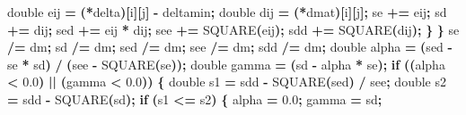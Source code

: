 \documentclass[
  12pt,
]{article}
\newenvironment{Shaded}{\begin{snugshade}}{\end{snugshade}}
\newcommand{\ControlFlowTok}[1]{\textcolor[rgb]{0.13,0.29,0.53}{\textbf{#1}}}
\newcommand{\DataTypeTok}[1]{\textcolor[rgb]{0.13,0.29,0.53}{#1}}
\newcommand{\FloatTok}[1]{\textcolor[rgb]{0.00,0.00,0.81}{#1}}
\newcommand{\NormalTok}[1]{#1}
\newcommand{\OperatorTok}[1]{\textcolor[rgb]{0.81,0.36,0.00}{\textbf{#1}}}
\begin{document}
\begin{Shaded}
\begin{Highlighting}[]
            \DataTypeTok{double}\NormalTok{ eij }\OperatorTok{=} \OperatorTok{(*}\NormalTok{delta}\OperatorTok{)[}\NormalTok{i}\OperatorTok{][}\NormalTok{j}\OperatorTok{]} \OperatorTok{{-}}\NormalTok{ deltamin}\OperatorTok{;}
            \DataTypeTok{double}\NormalTok{ dij }\OperatorTok{=} \OperatorTok{(*}\NormalTok{dmat}\OperatorTok{)[}\NormalTok{i}\OperatorTok{][}\NormalTok{j}\OperatorTok{];}
\NormalTok{            se }\OperatorTok{+=}\NormalTok{ eij}\OperatorTok{;}
\NormalTok{            sd }\OperatorTok{+=}\NormalTok{ dij}\OperatorTok{;}
\NormalTok{            sed }\OperatorTok{+=}\NormalTok{ eij }\OperatorTok{*}\NormalTok{ dij}\OperatorTok{;}
\NormalTok{            see }\OperatorTok{+=}\NormalTok{ SQUARE}\OperatorTok{(}\NormalTok{eij}\OperatorTok{);}
\NormalTok{            sdd }\OperatorTok{+=}\NormalTok{ SQUARE}\OperatorTok{(}\NormalTok{dij}\OperatorTok{);}
        \OperatorTok{\}}
    \OperatorTok{\}}
\NormalTok{    se }\OperatorTok{/=}\NormalTok{ dm}\OperatorTok{;}
\NormalTok{    sd }\OperatorTok{/=}\NormalTok{ dm}\OperatorTok{;}
\NormalTok{    sed }\OperatorTok{/=}\NormalTok{ dm}\OperatorTok{;}
\NormalTok{    see }\OperatorTok{/=}\NormalTok{ dm}\OperatorTok{;}
\NormalTok{    sdd }\OperatorTok{/=}\NormalTok{ dm}\OperatorTok{;}
    \DataTypeTok{double}\NormalTok{ alpha }\OperatorTok{=} \OperatorTok{(}\NormalTok{sed }\OperatorTok{{-}}\NormalTok{ se }\OperatorTok{*}\NormalTok{ sd}\OperatorTok{)} \OperatorTok{/} \OperatorTok{(}\NormalTok{see }\OperatorTok{{-}}\NormalTok{ SQUARE}\OperatorTok{(}\NormalTok{se}\OperatorTok{));}
    \DataTypeTok{double}\NormalTok{ gamma }\OperatorTok{=} \OperatorTok{(}\NormalTok{sd }\OperatorTok{{-}}\NormalTok{ alpha }\OperatorTok{*}\NormalTok{ se}\OperatorTok{);}
    \ControlFlowTok{if} \OperatorTok{((}\NormalTok{alpha }\OperatorTok{\textless{}} \FloatTok{0.0}\OperatorTok{)} \OperatorTok{||} \OperatorTok{(}\NormalTok{gamma }\OperatorTok{\textless{}} \FloatTok{0.0}\OperatorTok{))} \OperatorTok{\{}
        \DataTypeTok{double}\NormalTok{ s1 }\OperatorTok{=}\NormalTok{ sdd }\OperatorTok{{-}}\NormalTok{ SQUARE}\OperatorTok{(}\NormalTok{sed}\OperatorTok{)} \OperatorTok{/}\NormalTok{ see}\OperatorTok{;}
        \DataTypeTok{double}\NormalTok{ s2 }\OperatorTok{=}\NormalTok{ sdd }\OperatorTok{{-}}\NormalTok{ SQUARE}\OperatorTok{(}\NormalTok{sd}\OperatorTok{);}
        \ControlFlowTok{if} \OperatorTok{(}\NormalTok{s1 }\OperatorTok{\textless{}=}\NormalTok{ s2}\OperatorTok{)} \OperatorTok{\{}
\NormalTok{            alpha }\OperatorTok{=} \FloatTok{0.0}\OperatorTok{;}
\NormalTok{            gamma }\OperatorTok{=}\NormalTok{ sd}\OperatorTok{;}

\end{Highlighting}
\end{Shaded}
\end{document}
